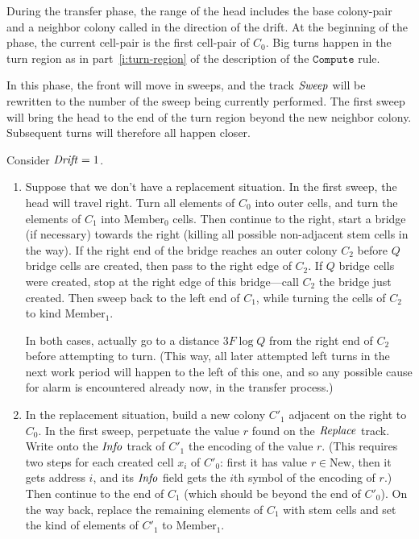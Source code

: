 \documentclass[11pt]{memoir}
\theoremstyle{definition} %
\newcommand{\fld}[1]{\ensuremath{\textit{#1\/}}}
\newcommand{\rul}[1]{\ensuremath{\texttt{#1}}}
\newcommand{\F}{F}
\newcommand{\Q}{Q} %
\newcommand{\Drift}{\fld{Drift}}
\newcommand{\Info}{\fld{Info}}
\newcommand{\Replace}{\fld{Replace}}
\newcommand{\Sweep}{\fld{Sweep}} %
\newcommand{\New}{\mathrm{New}}
\newcommand{\Member}{\mathrm{Member}}
\newcommand{\Compute}{\rul{Compute}}
\begin{document}
During the transfer phase, the range of the head includes the base colony-pair and a neighbor colony
called  in the direction of the drift.
At the beginning of the phase, the current cell-pair is the first cell-pair of \( C_{0} \).
Big turns happen in the turn region as in part~\ref{i:turn-region} of the
description of the \( \Compute \) rule.

In this phase, the front will move in sweeps, and the track \( \Sweep \) will be rewritten to
the number of the sweep being currently performed.
The first sweep will bring the head to the end of the turn region beyond the new neighbor colony.
Subsequent turns will therefore all happen closer.

Consider \( \Drift=1 \).

\begin{enumerate}
\item \label{i:target}
  Suppose that we don't have a replacement situation.
  In the first sweep, the head will travel right.
  Turn all elements of \( C_{0} \) into outer cells,
  and turn the elements of \( C_{1} \) into \( \Member_{0} \) cells.
  Then continue to the right, start a bridge (if necessary) towards the right
  (killing all possible non-adjacent stem cells in the way).
  If the right end of the bridge reaches an outer colony \( C_{2} \)
  before \( Q \) bridge cells are created, then pass to the right edge of \( C_{2} \).
  If \( Q \) bridge cells were created, stop at the right edge of this bridge---call \( C_{2} \)
  the bridge just created.
  Then sweep back to the left end of  \( C_{1} \), while turning the cells of \( C_{2} \) to 
  kind \( \Member_{1} \).

  In both cases, actually go to a distance \( 3\F\log \Q \) from the right end of \( C_{2} \)
  before attempting to turn.
  (This way, all later attempted left turns in the next work period
  will happen to the left of this one, and so any possible cause for alarm is encountered
  already now, in the transfer process.)

\item\label{i:replace}
  In the replacement situation, build a new colony \( C'_{1} \) adjacent on the right to \( C_{0} \).
  In the first sweep, perpetuate the value \( r \) found on the \( \Replace \) track.
  Write onto the  \( \Info \) track of \( C'_{1} \) the encoding of the value \( r \).
  (This requires two steps for each created cell \( x_{i} \) of \( C'_{0} \):
  first it has value \( r\in\New \), then it gets address \( i \), and its \( \Info \) field
  gets the \( i \)th symbol of the encoding of \( r \).)
  Then continue to the end of \( C_{1} \) (which should be beyond the end of \( C'_{0} \)).
  On the way back, replace the remaining elements of \( C_{1} \) with stem cells
  and set the kind of elements of \( C'_{1} \) to \( \Member_{1} \).

\end{enumerate}
\end{document}
